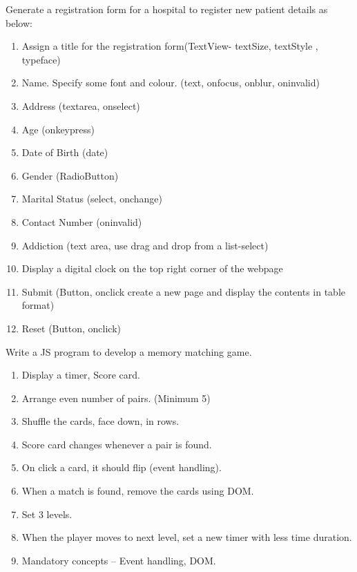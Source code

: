 \documentclass[12pt, a4]{article}
\begin{document}
\begin{flushleft}
Generate a registration form for a hospital to register new patient details as
below:

\begin{enumerate}
\item Assign a title for the registration form(TextView- textSize, textStyle ,
typeface)
\item Name. Specify some font and colour. (text, onfocus, onblur, oninvalid)
\item Address (textarea, onselect)
\item Age (onkeypress)
\item Date of Birth (date)
\item Gender (RadioButton)
\item Marital Status (select, onchange)
\item Contact Number (oninvalid)
\item Addiction (text area, use drag and drop from a list-select)
\item Display a digital clock on the top right corner of the webpage
\item Submit (Button, onclick create a new page and display the contents in table format)
\item Reset (Button, onclick)
\end{enumerate}

Write a JS program to develop a memory matching game.

\begin{enumerate}
\item Display a timer, Score card.
\item Arrange even number of pairs. (Minimum 5)
\item Shuffle the cards, face down, in rows.
\item Score card changes whenever a pair is found.
\item On click a card, it should flip (event handling).
\item When a match is found, remove the cards using DOM.
\item Set 3 levels.
\item When the player moves to next level, set a new timer with less time
duration.
\item Mandatory concepts – Event handling, DOM.
\end{enumerate}
 
\end{flushleft}

\newpage
\subsection*{}
\begin{flushleft}

\end{flushleft}
\end{document}
